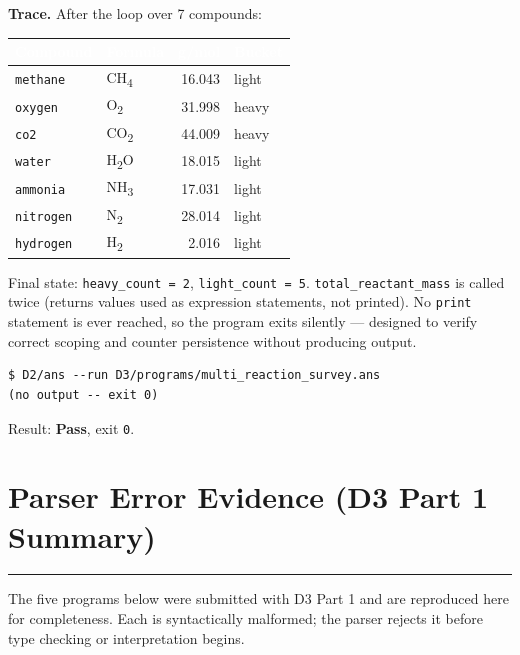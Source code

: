 \documentclass[11pt,a4paper]{article}
\newcommand{\code}[1]{\texttt{#1}}
\newcommand{\statusok}{\textcolor{anssuccess}{\textbf{Pass}}}
\newcommand{\sectionrule}{\vspace{-3pt}\textcolor{ansborder}{\rule{\textwidth}{0.6pt}}\vspace{2pt}}
\begin{document}
\smallskip
\textbf{Trace.} After the loop over 7 compounds:

\begin{table}[h]
\vspace{2pt}
\centering\small
{}
\begin{tabular}{@{} l l r l @{}}
\toprule
\rowcolor{ansblue}
\textcolor{white}{\textbf{Compound}} &
\textcolor{white}{\textbf{Formula}} &
\textcolor{white}{\textbf{g/mol}} &
\textcolor{white}{\textbf{Bucket}} \\
\midrule
\code{methane}  & CH\textsubscript{4} & 16.043 & light \\
\code{oxygen}   & O\textsubscript{2}  & 31.998 & heavy \\
\code{co2}      & CO\textsubscript{2} & 44.009 & heavy \\
\code{water}    & H\textsubscript{2}O & 18.015 & light \\
\code{ammonia}  & NH\textsubscript{3} & 17.031 & light \\
\code{nitrogen} & N\textsubscript{2}  & 28.014 & light \\
\code{hydrogen} & H\textsubscript{2}  &  2.016 & light \\
\bottomrule
\end{tabular}
\end{table}

Final state: \code{heavy\_count = 2}, \code{light\_count = 5}.
\code{total\_reactant\_mass} is called twice (returns values used as expression
statements, not printed). No \code{print} statement is ever reached, so the
program exits silently --- designed to verify correct scoping and counter
persistence without producing output.

\begin{lstlisting}[style=terminal]
$ D2/ans --run D3/programs/multi_reaction_survey.ans
(no output -- exit 0)
\end{lstlisting}
Result: \statusok, exit \code{0}.

\section{Parser Error Evidence (D3 Part 1 Summary)}
\sectionrule

The five programs below were submitted with D3 Part 1 and are reproduced here
for completeness. Each is syntactically malformed; the parser rejects it before
type checking or interpretation begins.
\end{document}
